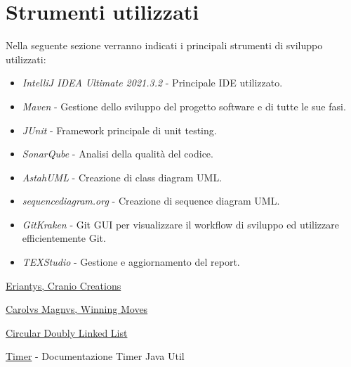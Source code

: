 \documentclass[a4paper, 12pt]{article}
\begin{document}
	\section{Strumenti utilizzati}
	Nella seguente sezione verranno indicati i principali strumenti di sviluppo utilizzati:\\
	\begin{itemize}
		\setlength{\parskip}{0pt}
		\setlength{\parsep}{0pt}
		
		\item \emph{IntelliJ IDEA Ultimate 2021.3.2} - Principale IDE utilizzato.
		\item \emph{Maven} - Gestione dello sviluppo del progetto software e di tutte le sue fasi.
		\item \emph{JUnit} - Framework principale di unit testing.
		\item \emph{SonarQube} - Analisi della qualità del codice.
		\item \emph{AstahUML} - Creazione di class diagram UML.
		\item \emph{sequencediagram.org} - Creazione di sequence diagram UML.
		\item \emph{GitKraken} - Git GUI per visualizzare il workflow di sviluppo ed utilizzare efficientemente Git.
		\item \emph{TEXStudio} - Gestione e aggiornamento del report.
	\end{itemize}

	\newpage
	\begin{thebibliography}{99}
		\href{https://www.craniocreations.it/prodotto/eriantys/}{Eriantys, Cranio Creations}
		
		\href{https://www.goblins.net/giochi/carolus-magnus-5071}{Carolvs Magnvs, Winning Moves} 
		
		\href{https://www.softwaretestinghelp.com/doubly-linked-list-in-java/#Circular_Doubly_Linked_List_In_Java}{Circular Doubly Linked List}
		
		\href{https://docs.oracle.com/javase/7/docs/api/java/util/Timer.html}{Timer} - Documentazione Timer Java Util
		
	\end{thebibliography} 
\end{document}
